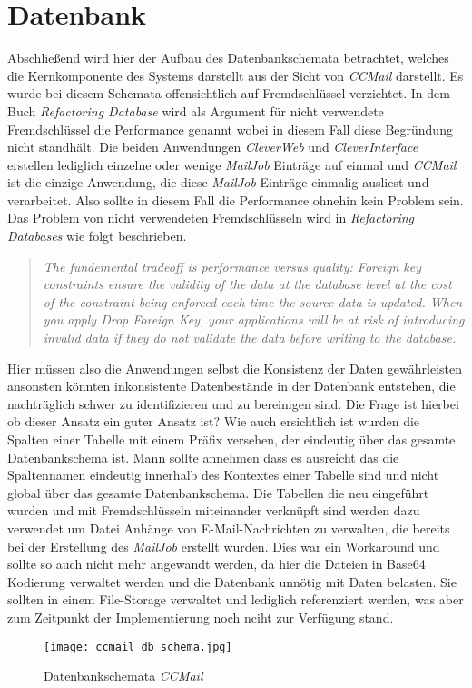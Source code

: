 \section{Datenbank}
\label{sec:ccmail-datanbank}
Abschließend wird hier der Aufbau des Datenbankschemata betrachtet, welches die Kernkomponente des Systems darstellt aus der Sicht von \emph{CCMail} darstellt.
Es wurde bei diesem Schemata offensichtlich auf Fremdschlüssel verzichtet. 
In dem Buch \emph{Refactoring Database} \cite[213]{refactoreDatabase} wird als Argument für nicht verwendete Fremdschlüssel die Performance genannt wobei in diesem Fall diese Begründung nicht standhält. Die beiden Anwendungen \emph{CleverWeb} und \emph{CleverInterface} erstellen lediglich einzelne oder wenige \emph{MailJob} Einträge auf einmal und \emph{CCMail} ist die einzige Anwendung, die diese \emph{MailJob} Einträge einmalig ausliest und verarbeitet. Also sollte in diesem Fall die Performance ohnehin kein Problem sein. Das Problem von nicht verwendeten Fremdschlüsseln wird in \emph{Refactoring Databases} \cite[213]{refactoreDatabase} wie folgt beschrieben.
\begin{quote}
\emph{The fundemental tradeoff is performance versus quality: Foreign key constraints ensure the validity of the data at the database level at the cost of the constraint being enforced each time the source data is updated. When you apply Drop Foreign Key, your applications will be at risk of introducing invalid data if they do not validate the data before writing to the database.}
\end{quote}
Hier müssen also die Anwendungen selbst die Konsistenz der Daten gewährleisten ansonsten könnten inkonsistente Datenbestände in der Datenbank entstehen, die nachträglich schwer zu identifizieren und zu bereinigen sind. Die Frage ist hierbei ob dieser Ansatz ein guter Ansatz ist?
\newline
\newline
Wie auch ersichtlich ist wurden die Spalten einer Tabelle mit einem Präfix versehen, der eindeutig über das gesamte Datenbankschema ist. Mann sollte annehmen dass es ausreicht das die Spaltennamen eindeutig innerhalb des Kontextes einer Tabelle sind und nicht global über das gesamte Datenbankschema. Die Tabellen die neu eingeführt wurden und mit Fremdschlüsseln miteinander verknüpft sind werden dazu verwendet um Datei Anhänge von E-Mail-Nachrichten zu verwalten, die bereits bei der Erstellung des \emph{MailJob} erstellt wurden. Dies war ein Workaround und sollte so auch nicht mehr angewandt werden, da hier die Dateien in Base64 Kodierung verwaltet werden und die Datenbank unnötig mit Daten belasten. Sie sollten in einem File-Storage verwaltet und lediglich referenziert werden, was aber zum Zeitpunkt der Implementierung noch nciht zur Verfügung stand. 
\begin{figure}[h]
\centering
\texttt{[image: ccmail\_db\_schema.jpg]} 
\caption{Datenbankschemata \emph{CCMail}}
\label{fig:db-schema-ccmail}
\end{figure}

